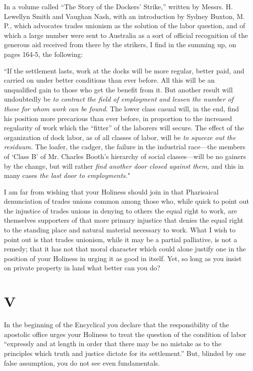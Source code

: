 \documentclass{book}
\begin{document}
In a volume called “The Story of the Dockers’ Strike,” written by Messrs. H. Lewellyn Smith and Vaughan Nash, with an introduction by Sydney Buxton, M. P., which advocates trades unionism as the solution of the labor question, and of which a large number were sent to Australia as a sort of official recognition of the generous aid received from there by the strikers, I find in the summing up, on pages 164-5, the following:

“If the settlement lasts, work at the docks will be more regular, better paid, and carried on under better conditions than ever before. All this will be an unqualified gain to those who get the benefit from it. But another result will undoubtedly be \emph{to contract the field of employment and lessen the number of those for whom work can be found.} The lower class casual will, in the end, find his position more precarious than ever before, in proportion to the increased regularity of work which the “fitter” of the laborers will secure. The effect of the organization of dock labor, as of all classes of labor, will be \emph{to squeeze out the residuum.} The loafer, the cadger, the failure in the industrial race—the members of ‘Class B’ of Mr. Charles Booth’s hierarchy of social classes—will be no gainers by the change, but will rather \emph{find another door closed against them,} and this in many cases \emph{the last door to employments.}"

I am far from wishing that your Holiness should join in that Pharisaical denunciation of trades unions common among those who, while quick to point out the injustice of trades unions in denying to others the equal right to work, are themselves supporters of that more primary injustice that denies the equal right to the standing place and natural material necessary to work. What I wish to point out is that trades unionism, while it may be a partial palliative, is not a remedy; that it has not that moral character which could alone justify one in the position of your Holiness in urging it as good in itself. Yet, so long as you insist on private property in land what better can you do?

\chapter*{V}
\label{chapter-5}
In the beginning of the Encyclical you declare that the responsibility of the apostolic office urges your Holiness to treat the question of the condition of labor “expressly and at length in order that there may be no mistake as to the principles which truth and justice dictate for its settlement.” But, blinded by one false assumption, you do not see even fundamentals.
\end{document}
